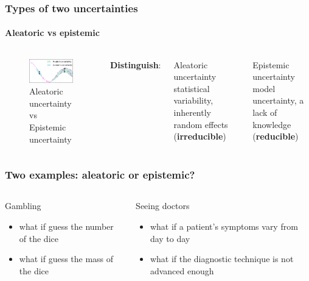 \begin{frame}
\frametitle{Types of two uncertainties}
\framesubtitle{Aleatoric vs epistemic}

\begin{columns}
        \begin{figure}
        \centering
            \includegraphics[width = 9cm]{figures/aleatoricvsepisidemic.pdf}
            \caption{Aleatoric uncertainty vs Epistemic uncertainty}
        \end{figure} 
     \textbf{Distinguish}:
     \begin{block}{Aleatoric uncertainty}
statistical variability, inherently random effects (\textbf{irreducible})
     \end{block}
     \begin{block}{Epistemic uncertainty}
model uncertainty, a lack of knowledge (\textbf{reducible})
     \end{block}    
    \end{columns}
\end{frame}

\begin{frame}
\frametitle{Two examples: aleatoric or epistemic?}
\begin{columns}
    \begin{example}{Gambling}
        \begin{itemize}
            \item what if guess the number of the dice
            \item what if guess the mass of the dice
        \end{itemize}
    \end{example}
    \begin{example}{Seeing doctors}
        \begin{itemize}
            \item what if a patient's symptoms vary from day to day
            \item what if the diagnostic technique is not advanced enough
        \end{itemize}
    \end{example}
\end{columns}


\end{frame}


